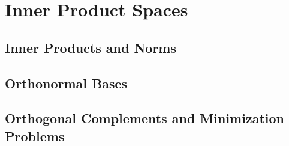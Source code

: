 \chapter{Inner Product Spaces}

\section{\label{6.A} Inner Products and Norms}

\section{\label{6.B} Orthonormal Bases}

\section{\label{6.C} Orthogonal Complements and Minimization Problems}

